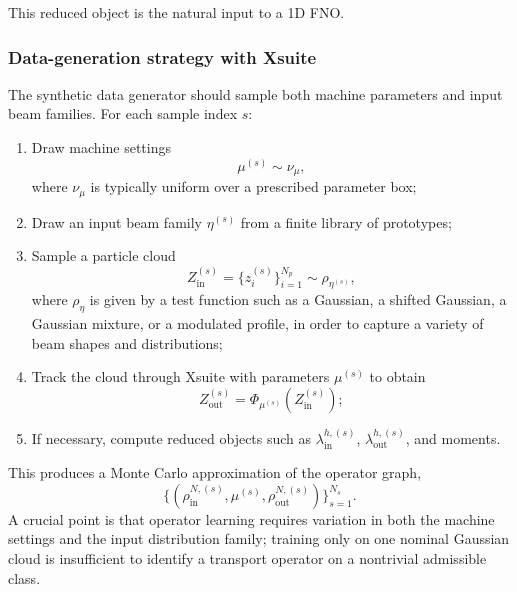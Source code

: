 \documentclass[11pt,a4paper]{article}
\begin{document}
\begin{sloppypar}
This reduced object is the natural input to a 1D FNO.

\subsubsection{Data-generation strategy with Xsuite}
\label{subsubsec:data-generation-strategy}

The synthetic data generator should sample both machine parameters and input beam families.
For each sample index $s$:
\begin{enumerate}
    \item Draw machine settings
    \begin{equation}
    \mu^{(s)} \sim \nu_{\mu},
    \end{equation}
    where $\nu_\mu$ is typically uniform over a prescribed parameter box;
    \item Draw an input beam family $\eta^{(s)}$ from a finite library of prototypes;
    \item Sample a particle cloud
    \begin{equation}
    Z_{\mathrm{in}}^{(s)} = \{z_i^{(s)}\}_{i=1}^{N_p} \sim \rho_{\eta^{(s)}},
    \end{equation}
    where $\rho_{\eta}$ is given by a test function such as a Gaussian, a shifted Gaussian, a Gaussian mixture, or a modulated profile, in order to capture a variety of beam shapes and distributions;
    \item Track the cloud through Xsuite with parameters $\mu^{(s)}$ to obtain
    \begin{equation}
    Z_{\mathrm{out}}^{(s)} = \Phi_{\mu^{(s)}}\left(Z_{\mathrm{in}}^{(s)}\right);
    \end{equation}
    \item If necessary, compute reduced objects such as $\lambda_{\mathrm{in}}^{h,(s)}$, $\lambda_{\mathrm{out}}^{h,(s)}$, and moments.
\end{enumerate}

This produces a Monte Carlo approximation of the operator graph,
\begin{equation}
 \{(\rho_{\mathrm{in}}^{N,(s)},\mu^{(s)},\rho_{\mathrm{out}}^{N,(s)})\}_{s=1}^{N_s}.
 \label{eq:operator-graph-montecarlo}
\end{equation}
A crucial point is that operator learning requires variation in both the machine settings and the input distribution family; training only on one nominal Gaussian cloud is insufficient to identify a transport operator on a nontrivial admissible class.


\end{sloppypar}
\end{document}
